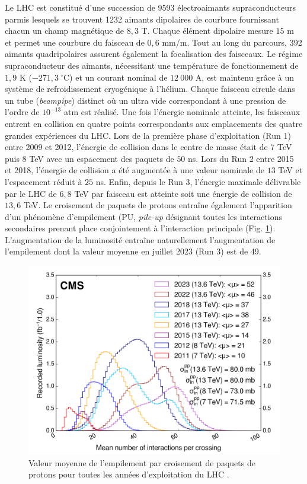 Le LHC est constitué d'une succession de 9593 électroaimants supraconducteurs parmis lesquels se trouvent 1232 aimants dipolaires de courbure fournissant chacun un champ magnétique de $8,3$ T. Chaque élément dipolaire mesure $15$ m et permet une courbure du faisceau de $0,6$ mm/m. Tout au long du parcours, 392 aimants quadripolaires assurent également la focalisation des faisceaux. Le régime supraconducteur des aimants, nécessitant une température de fonctionnement de $1,9$ K ($-271,3~^\circ$C) et un courant nominal de $12~000$ A, est maintenu grâce à un système de refroidissement cryogénique à l'hélium. Chaque faisceau circule dans un tube (\textit{beampipe}) distinct où un ultra vide correspondant à une pression de l'ordre de $10^{-13}$ atm est réalisé. Une fois l'énergie nominale atteinte, les faisceaux entrent en collision en quatre points correspondants aux emplacements des quatre grandes expériences du LHC. Lors de la première phase d'exploitation (Run 1) entre 2009 et 2012, l'énergie de collision dans le centre de masse était de $7$ TeV puis $8$ TeV avec un espacement des paquets de $50$ ns. Lors du Run 2 entre 2015 et 2018, l'énergie de collision a été augmentée à une valeur nominale de $13$ TeV et l'espacement réduit à $25$ ns. Enfin, depuis le Run 3, l'énergie maximale délivrable par le LHC de $6,8$ TeV par faisceau est atteinte soit une énergie de collision de $13,6$ TeV. Le croisement de paquets de protons entraîne également l'apparition d'un phénomène d'empilement (PU, \textit{pile-up} désignant toutes les interactions secondaires prenant place conjointement à l'interaction principale (Fig. \ref{PU}). L'augmentation de la luminosité entraîne naturellement l'augmentation de l'empilement dont la valeur moyenne en juillet 2023 (Run 3) est de 49. \\

\begin{figure}
\centering
    \includegraphics[scale=0.5]{Chapitre3/Images/pileup_allYears.png} 
\caption{Valeur moyenne de l'empilement par croisement de paquets de protons pour toutes les années d'exploitation du LHC \cite{LumiTwiki}.}
\label{PU}
\end{figure}

